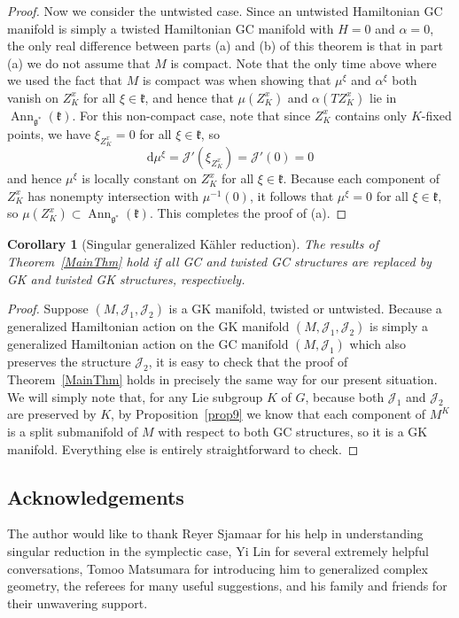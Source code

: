 \documentclass[pdftex]{sigma}
\newtheorem{Corollary}[Theorem]{Corollary}
{\theoremstyle{definition}
\newtheorem{Remark}[Theorem]{Remark}
\newtheorem{Definition}[Theorem]{Definition}
\newtheorem{Example}[Theorem]{Example}
}
\numberwithin{equation}{section}
\newcommand{\tang}{T}
\begin{document}
\begin{proof}
Now we consider the untwisted case.
Since an untwisted Hamiltonian GC manifold is simply a twisted Hamiltonian GC manifold with $H=0$ and $\alpha = 0$, the only real dif\/ference between parts (a) and (b) of this theorem is that in part (a) we do not assume that $M$ is compact.
Note that the only time above where we used the fact that $M$ is compact was when showing that $\mu^{\xi}$ and $\alpha^{\xi}$ both vanish on $Z_K^x$ for all $\xi \in \mathfrak{k}$, and hence that $\mu(Z_K^x)$ and $\alpha( \tang Z_K^x)$ lie in $\operatorname{Ann}_{\mathfrak{g}^*} (\mathfrak{k})$.
For this non-compact case, note that since $Z_K^x$ contains only $K$-f\/ixed points, we have $\xi_{Z_K^x} = 0$ for all $\xi \in \mathfrak{k}$, so
\[
  \mathrm{d} \mu^{\xi} = \mathcal{J}'(\xi_{Z_K^x})
  = \mathcal{J}'(0) = 0
\]
and hence $\mu^{\xi}$ is locally constant on $Z_K^x$ for all $\xi \in \mathfrak{k}$.
Because each component of $Z_K^x$ has nonempty intersection with $\mu^{-1}(0)$, it follows that $\mu^{\xi} = 0$ for all $\xi \in \mathfrak{k}$, so $\mu(Z_K^x) \subset \operatorname{Ann}_{\mathfrak{g}^*} (\mathfrak{k})$.
This completes the proof of (a).
\end{proof}


\begin{Corollary}[Singular generalized K\"ahler reduction] \label{MainThm2}
The results of Theorem~{\rm \ref{MainThm}} hold if all GC and twisted GC structures are replaced by GK and twisted GK structures, respectively.
\end{Corollary}


\begin{proof}
Suppose $(M,\mathcal{J}_1,\mathcal{J}_2)$ is a GK manifold, twisted or untwisted.  Because a generalized Hamiltonian action on the GK manifold $(M,\mathcal{J}_1,\mathcal{J}_2)$ is simply a generalized Hamiltonian action on the GC manifold $(M,\mathcal{J}_1)$ which also preserves the structure $\mathcal{J}_2$, it is easy to check that the proof of Theorem~\ref{MainThm} holds in precisely the same way for our present situation.  We will simply note that, for any Lie subgroup $K$ of $G$, because both $\mathcal{J}_1$ and $\mathcal{J}_2$ are preserved by $K$, by Proposition~\ref{prop9} we know that each component of $M^K$ is a split submanifold of $M$ with respect to both GC structures, so it is a GK manifold.  Everything else is entirely straightforward to check.
\end{proof}


\subsection*{Acknowledgements}
The author would like to thank Reyer Sjamaar for his help in understanding singular reduction in the symplectic case, Yi Lin for several extremely helpful conversations, Tomoo Matsumara for introducing him to generalized complex geometry, the referees for many useful suggestions, and his family and friends for their unwavering support.
\end{document}

